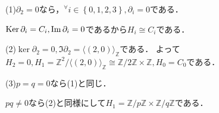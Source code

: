 \documentclass[
		book,
		head_space=20mm,
		foot_space=20mm,
		gutter=10mm,
		line_length=190mm
]{jlreq}
\begin{document}
(1)$\partial_2=0$なら，$^\forall i \in \left\{ 0,1,2,3 \right\},\partial_i =0$である．

$\mathop{\mathrm{Ker}} \partial_i = C_i,\mathop{\mathrm{Im}} \partial_i =0$であるから$H_i\cong C_i$である．

(2)$\ker \partial_2=0,\Im \partial_2=\langle (2,0) \rangle_{\mathbb{Z}}$である．
よって$H_2=0,H_1=\mathbb{Z}^2/\langle (2,0) \rangle_{\mathbb{Z}}\cong \mathbb{Z}/2\mathbb{Z} \times \mathbb{Z},H_0=C_0$である．

(3)$p=q=0$なら(1)と同じ．

$pq\neq 0$なら(2)と同様にして$H_1=\mathbb{Z}/ p \mathbb{Z} \times \mathbb{Z}/q \mathbb{Z}$である．
\end{document}
